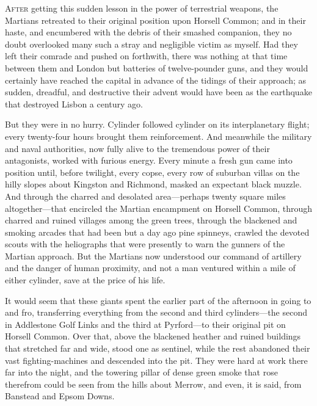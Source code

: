 


\lettrine[lines=4]{A}{fter} getting this sudden lesson in the power of terrestrial weapons, the Martians retreated to their original position upon Horsell Common; and in their haste, and encumbered with the debris of their smashed companion, they no doubt overlooked many such a stray and negligible victim as myself. Had they left their comrade and pushed on forthwith, there was nothing at that time between them and London but batteries of twelve-pounder guns, and they would certainly have reached the capital in advance of the tidings of their approach; as sudden, dreadful, and destructive their advent would have been as the earthquake that destroyed Lisbon a century ago.

But they were in no hurry. Cylinder followed cylinder on its interplanetary flight; every twenty-four hours brought them reinforcement. And meanwhile the military and naval authorities, now fully alive to the tremendous power of their antagonists, worked with furious energy. Every minute a fresh gun came into position until, before twilight, every copse, every row of suburban villas on the hilly slopes about Kingston and Richmond, masked an expectant black muzzle. And through the charred and desolated area—perhaps twenty square miles altogether—that encircled the Martian encampment on Horsell Common, through charred and ruined villages among the green trees, through the blackened and smoking arcades that had been but a day ago pine spinneys, crawled the devoted scouts with the heliographs that were presently to warn the gunners of the Martian approach. But the Martians now understood our command of artillery and the danger of human proximity, and not a man ventured within a mile of either cylinder, save at the price of his life.

It would seem that these giants spent the earlier part of the afternoon in going to and fro, transferring everything from the second and third cylinders—the second in Addlestone Golf Links and the third at Pyrford—to their original pit on Horsell Common. Over that, above the blackened heather and ruined buildings that stretched far and wide, stood one as sentinel, while the rest abandoned their vast fighting-machines and descended into the pit. They were hard at work there far into the night, and the towering pillar of dense green smoke that rose therefrom could be seen from the hills about Merrow, and even, it is said, from Banstead and Epsom Downs.

